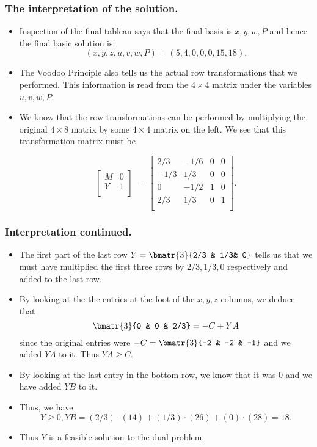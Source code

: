 \begin{frame}%
  \frametitle{The interpretation of the solution.}
  \begin{itemize}%
 

\item
Inspection of the final tableau says that the final basis is $x,y,w,P$
and hence the final basic solution is:
$$(x,y,z,u,v,w,P)=(5,4,0,0,0,15,18).$$

\item The Voodoo Principle also tells us the actual row transformations
that we performed. This information is read  from the $4\times 4$
matrix under the variables $u,v,w,P$.

\item We know that the row transformations can be performed by
multiplying the original $4\times 8$ matrix by some $4\times 4$ matrix
on the left.
We see that this transformation matrix  must be

$$
\left[
\begin{array}{l|l}
M & 0 \\\hline
Y & 1\\
\end{array}
\right]
~=~
\left[
\begin{array}{rrr|r}
2/3 & -1/6 & 0 & 0\\
-1/3 & 1/3 & 0 & 0\\
0 & -1/2 & 1 & 0\\\hline
2/3 & 1/3 & 0 & 1\\
\end{array}
\right]
.$$

\end{itemize}
\end{frame}




\begin{frame}%
 \frametitle{Interpretation continued.}
  \begin{itemize}%

\item The first part of the last row $Y=\bmatr{3}{2/3 & 1/3& 0}$ tells
us that we must have multiplied the first three rows by $2/3, 1/3,0$
respectively and added to the last row.

\item By looking at the the entries at the foot of the $x,y,z$ columns,
we deduce that
$$\bmatr{3}{0 & 0 & 2/3} = -C+YA$$
since the original entries were $-C = \bmatr{3}{-2 & -2 & -1}$ and we
added $YA$ to it.
Thus $YA\geq C$.

\item By looking at the last entry in the bottom row, we know that it
was $0$ and we have added $YB$ to it.

\item Thus, we have
$$Y\ge 0, YB = (2/3)\cdot(14)+ (1/3)\cdot(26)+(0)\cdot(28) = 18.$$

\item Thus $Y$ is a feasible solution to the dual problem.

\end{itemize}
\end{frame}

